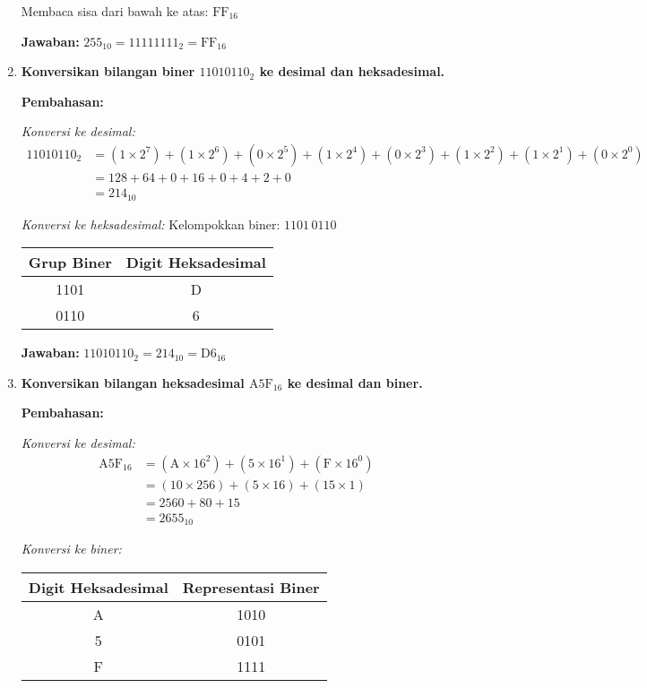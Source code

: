 \begin{enumerate}
    Membaca sisa dari bawah ke atas: \(\mathrm{FF}_{16}\)
    
    \textbf{Jawaban:} \(255_{10} = 11111111_2 = \mathrm{FF}_{16}\)

    \item \textbf{Konversikan bilangan biner \(11010110_2\) ke desimal dan heksadesimal.}
    
    \textbf{Pembahasan:}
    
    \textit{Konversi ke desimal:}
    \begin{align*}
    11010110_2 &= (1 \times 2^7) + (1 \times 2^6) + (0 \times 2^5) + (1 \times 2^4) + (0 \times 2^3) + (1 \times 2^2) + (1 \times 2^1) + (0 \times 2^0) \\
    &= 128 + 64 + 0 + 16 + 0 + 4 + 2 + 0 \\
    &= 214_{10}
    \end{align*}
    
    \textit{Konversi ke heksadesimal:}
    Kelompokkan biner: \(1101\,0110\)
    \begin{center}
    \begin{tabular}{|c|c|}
    \hline
    \textbf{Grup Biner} & \textbf{Digit Heksadesimal} \\
    \hline
    1101 & D \\
    0110 & 6 \\
    \hline
    \end{tabular}
    \end{center}
    
    \textbf{Jawaban:} \(11010110_2 = 214_{10} = \mathrm{D6}_{16}\)

    \item \textbf{Konversikan bilangan heksadesimal \(\mathrm{A5F}_{16}\) ke desimal dan biner.}
    
    \textbf{Pembahasan:}
    
    \textit{Konversi ke desimal:}
    \begin{align*}
    \mathrm{A5F}_{16} &= (\mathrm{A} \times 16^2) + (5 \times 16^1) + (\mathrm{F} \times 16^0) \\
    &= (10 \times 256) + (5 \times 16) + (15 \times 1) \\
    &= 2560 + 80 + 15 \\
    &= 2655_{10}
    \end{align*}
    
    \textit{Konversi ke biner:}
    \begin{center}
    \begin{tabular}{|c|c|}
    \hline
    \textbf{Digit Heksadesimal} & \textbf{Representasi Biner} \\
    \hline
    A & 1010 \\
    5 & 0101 \\
    F & 1111 \\
    \hline
    \end{tabular}
    \end{center}
    

\end{enumerate}
